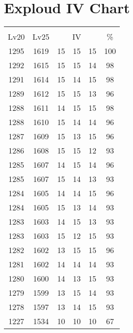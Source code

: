 \documentclass{article}%
\begin{document}
%
\normalsize%
\section{Exploud IV Chart}%
\label{sec:Exploud IV Chart}%
\renewcommand{\arraystretch}{1.5}%
\begin{tabular}{|c|c|c|c|c|c|}%
\hline%
\multicolumn{6}{|c|}{\textcolor{white}{ 
\linebreak{Exploud}
}%
\cellcolor{black}}\\%
\multicolumn{1}{|c}{Lv20}&\multicolumn{1}{c|}{Lv25}&\multicolumn{3}{c|}{IV}&\multicolumn{1}{|c|}{\%}\\%
\hline%
\rowcolor{color100}%
1295&1619&15&15&15&100\\%
\hline%
\rowcolor{color98}%
1292&1615&15&15&14&98\\%
\hline%
\rowcolor{color98}%
1291&1614&15&14&15&98\\%
\hline%
\rowcolor{color96}%
1289&1612&15&15&13&96\\%
\hline%
\rowcolor{color98}%
1288&1611&14&15&15&98\\%
\hline%
\rowcolor{color96}%
1288&1610&15&14&14&96\\%
\hline%
\rowcolor{color96}%
1287&1609&15&13&15&96\\%
\hline%
\rowcolor{color93}%
1286&1608&15&15&12&93\\%
\hline%
\rowcolor{color96}%
1285&1607&14&15&14&96\\%
\hline%
\rowcolor{color93}%
1285&1607&15&14&13&93\\%
\hline%
\rowcolor{color96}%
1284&1605&14&14&15&96\\%
\hline%
\rowcolor{color93}%
1284&1605&15&13&14&93\\%
\hline%
\rowcolor{color93}%
1283&1603&14&15&13&93\\%
\hline%
\rowcolor{color93}%
1283&1603&15&12&15&93\\%
\hline%
\rowcolor{color96}%
1282&1602&13&15&15&96\\%
\hline%
\rowcolor{color93}%
1281&1602&14&14&14&93\\%
\hline%
\rowcolor{color93}%
1280&1600&14&13&15&93\\%
\hline%
\rowcolor{color93}%
1279&1599&13&15&14&93\\%
\hline%
\rowcolor{color93}%
1278&1597&13&14&15&93\\%
\hline%
\rowcolor{color91}%
1227&1534&10&10&10&67\\%
\end{tabular}

%
\end{document}
